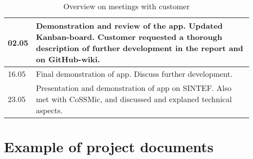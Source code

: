 \begin{table}[H]
\begin{tabular}{|l|p{14.7cm}|}
02.05& Demonstration and review of the app. Updated Kanban-board. Customer requested a thorough description of further development in the report and on GitHub-wiki. \\\hline
16.05&Final demonstration of app. Discuss further development.\\\hline
23.05& Presentation and demonstration of app on SINTEF. Also met with CoSSMic, and discussed and explaned technical aspects.\\\hline
\end{tabular}
\caption{Overview on meetings with customer}
\end{table}







\chapter{Example of project documents}









